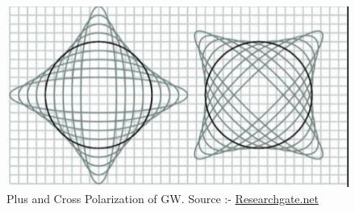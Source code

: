 \begin{figure}[h]
    \centering
    \includegraphics[scale=0.4]{images.tex/polarization.jpeg}
    \caption{Plus and Cross Polarization of GW. Source :- \href{https://www.researchgate.net/figure/fig4_228909324}{Researchgate.net}}
\end{figure}

\pagebreak
